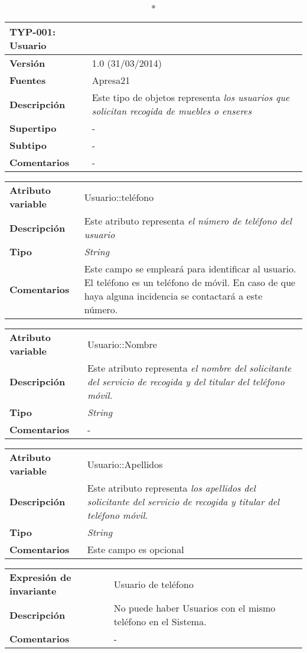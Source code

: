 
\begin{longtable}{p{2.5cm}  p{14cm}}
\caption*{\textbf{TYP-001: Usuario}} \\
\hline
\textbf{Versión} & 1.0 (31/03/2014) \\
\textbf{Fuentes} & Apresa21 \\
\textbf{Descripción} & Este tipo de objetos representa  \textit{los usuarios que solicitan recogida de muebles o enseres} \\
\textbf{Supertipo} & - \\
\textbf{Subtipo} & -  \\
\textbf{Comentarios} &- \\
\end{longtable}

\begin{longtable}{p{3cm}  p{12cm}}
\hline
\textbf{Atributo variable} & Usuario::teléfono \\
\textbf{Descripción} & Este atributo representa  \textit{el número de teléfono del usuario} \\
\textbf{Tipo} & \textit{String} \\
\textbf{Comentarios} & Este campo se empleará para identificar al usuario. El teléfono es un teléfono de móvil. En caso de que haya alguna incidencia se contactará a este número. \\
\end{longtable}

\begin{longtable}{p{3cm}  p{12cm}}
\hline
\textbf{Atributo variable} & Usuario::Nombre \\
\textbf{Descripción} & Este atributo representa  \textit{el nombre del solicitante del servicio de recogida y del titular del teléfono móvil.} \\
\textbf{Tipo} & \textit{String} \\
\textbf{Comentarios} &- \\
\end{longtable}

\begin{longtable}{p{3cm}  p{12cm}}
\hline
\textbf{Atributo variable} & Usuario::Apellidos \\
\textbf{Descripción} & Este atributo representa  \textit{los apellidos del solicitante del servicio de recogida y titular del teléfono móvil.} \\
\textbf{Tipo} & \textit{String} \\
\textbf{Comentarios} & Este campo es opcional \\
\end{longtable}

\begin{longtable}{p{3cm}  p{12cm}}
\hline
\textbf{Expresión de invariante} & Usuario de teléfono \\
\textbf{Descripción} & No puede haber Usuarios con el mismo teléfono en el Sistema. \\
\textbf{Comentarios} & - \\
\end{longtable}
